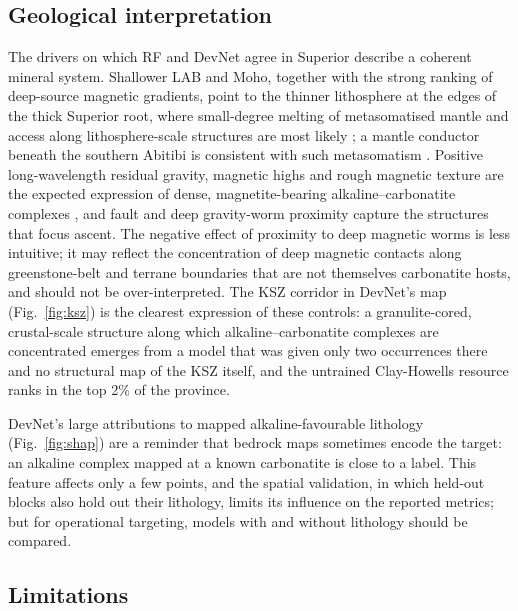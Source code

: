 \documentclass[pdflatex,sn-apa]{sn-jnl}
\begin{document}
\subsection{Geological interpretation}\label{sec:disc-geology}

The drivers on which RF and DevNet agree in Superior describe a coherent mineral system. Shallower LAB and Moho, together with the strong ranking of deep-source magnetic gradients, point to the thinner lithosphere at the edges of the thick Superior root, where small-degree melting of metasomatised mantle and access along lithosphere-scale structures are most likely \citep{Griffin2013,Groves2021,Hoggard2020}; a mantle conductor beneath the southern Abitibi is consistent with such metasomatism \citep{Snyder2021}. Positive long-wavelength residual gravity, magnetic highs and rough magnetic texture are the expected expression of dense, magnetite-bearing alkaline--carbonatite complexes \citep{Thomas2016}, and fault and deep gravity-worm proximity capture the structures that focus ascent. The negative effect of proximity to deep magnetic worms is less intuitive; it may reflect the concentration of deep magnetic contacts along greenstone-belt and terrane boundaries that are not themselves carbonatite hosts, and should not be over-interpreted. The KSZ corridor in DevNet's map (Fig.~\ref{fig:ksz}) is the clearest expression of these controls: a granulite-cored, crustal-scale structure along which alkaline--carbonatite complexes are concentrated \citep{Percival1994,Gittins1967} emerges from a model that was given only two occurrences there and no structural map of the KSZ itself, and the untrained Clay-Howells resource ranks in the top 2\% of the province.

DevNet's large attributions to mapped alkaline-favourable lithology (Fig.~\ref{fig:shap}) are a reminder that bedrock maps sometimes encode the target: an alkaline complex mapped at a known carbonatite is close to a label. This feature affects only a few points, and the spatial validation, in which held-out blocks also hold out their lithology, limits its influence on the reported metrics; but for operational targeting, models with and without lithology should be compared.

\subsection{Limitations}\label{sec:limitations}
\end{document}
